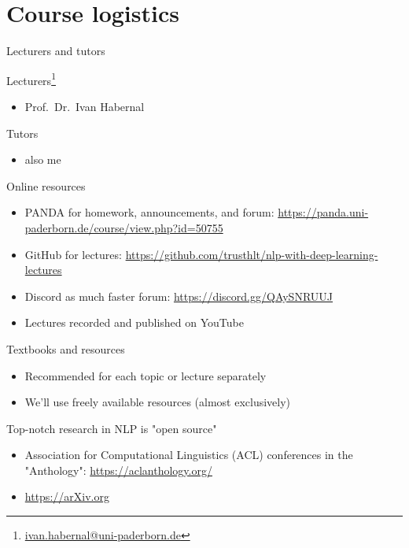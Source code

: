 \documentclass[12pt,aspectratio=169,handout]{beamer}
\begin{document}
\section{Course logistics}


\begin{frame}{Lecturers and tutors}

Lecturers\footnote{\url{ivan.habernal@uni-paderborn.de}}

\begin{itemize}
	\item Prof.\ Dr.\ Ivan Habernal
\end{itemize}

Tutors

\begin{itemize}
	\item also me
\end{itemize}

\end{frame}



\begin{frame}{Online resources}
	
\begin{itemize}
	\item PANDA for homework, announcements, and forum: \url{https://panda.uni-paderborn.de/course/view.php?id=50755}
	\item GitHub for lectures: \url{https://github.com/trusthlt/nlp-with-deep-learning-lectures}
	\item Discord as much faster forum: \url{https://discord.gg/QAySNRUUJ}
	\item Lectures recorded and published on YouTube
\end{itemize}
	
\end{frame}

\begin{frame}{Textbooks and resources}
	
\begin{itemize}
	\item Recommended for each topic or lecture separately
	\item We'll use freely available resources (almost exclusively)
\end{itemize}

Top-notch research in NLP is "open source"

\begin{itemize}
	\item Association for Computational Linguistics (ACL) conferences in the "Anthology": \url{https://aclanthology.org/}
	\item \url{https://arXiv.org}
\end{itemize}
	
\end{frame}
\end{document}
